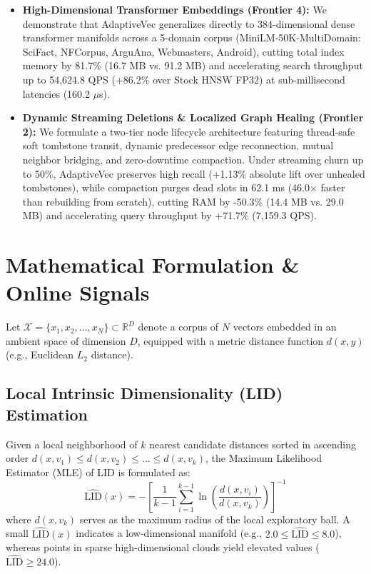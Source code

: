 \documentclass[conference,10pt]{IEEEtran}
\begin{document}
\begin{itemize}
    \item \textbf{High-Dimensional Transformer Embeddings (Frontier 4):} We demonstrate that AdaptiveVec generalizes directly to 384-dimensional dense transformer manifolds across a 5-domain corpus (MiniLM-50K-MultiDomain: SciFact, NFCorpus, ArguAna, Webmasters, Android), cutting total index memory by 81.7\% (16.7 MB vs. 91.2 MB) and accelerating search throughput up to 54,624.8 QPS (+86.2\% over Stock HNSW FP32) at sub-millisecond latencies (160.2 $\mu$s).
    \item \textbf{Dynamic Streaming Deletions \& Localized Graph Healing (Frontier 2):} We formulate a two-tier node lifecycle architecture featuring thread-safe soft tombstone transit, dynamic predecessor edge reconnection, mutual neighbor bridging, and zero-downtime compaction. Under streaming churn up to 50\%, AdaptiveVec preserves high recall (+1.13\% absolute lift over unhealed tombstones), while compaction purges dead slots in 62.1 ms (46.0$\times$ faster than rebuilding from scratch), cutting RAM by -50.3\% (14.4 MB vs. 29.0 MB) and accelerating query throughput by +71.7\% (7,159.3 QPS).
\end{itemize}

\section{Mathematical Formulation \& Online Signals}
Let $\mathcal{X} = \{x_1, x_2, \dots, x_N\} \subset \mathbb{R}^D$ denote a corpus of $N$ vectors embedded in an ambient space of dimension $D$, equipped with a metric distance function $d(x, y)$ (e.g., Euclidean $L_2$ distance).

\subsection{Local Intrinsic Dimensionality (LID) Estimation}
Given a local neighborhood of $k$ nearest candidate distances sorted in ascending order $d(x, v_1) \le d(x, v_2) \le \dots \le d(x, v_k)$, the Maximum Likelihood Estimator (MLE) of LID \cite{levina2005mle, amsaleg2015lid} is formulated as:
\begin{equation}
\widehat{\text{LID}}(x) = -\left[ \frac{1}{k - 1} \sum_{i=1}^{k-1} \ln \left( \frac{d(x, v_i)}{d(x, v_k)} \right) \right]^{-1}
\end{equation}
where $d(x, v_k)$ serves as the maximum radius of the local exploratory ball. A small $\widehat{\text{LID}}(x)$ indicates a low-dimensional manifold (e.g., $2.0 \le \widehat{\text{LID}} \le 8.0$), whereas points in sparse high-dimensional clouds yield elevated values ($\widehat{\text{LID}} \ge 24.0$).
\end{document}
